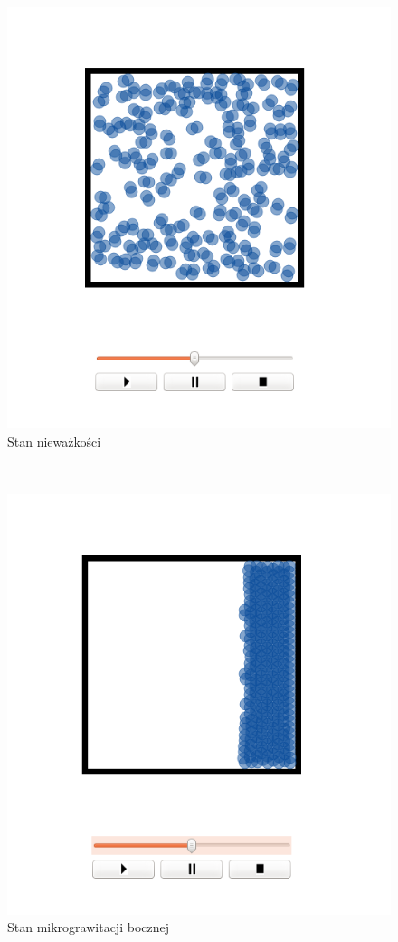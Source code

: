 \begin{minipage}{0.5\textwidth}
\begin{figure}[H]
 \begin{center}
  \includegraphics[width=\textwidth]{./rysunki/niewazkosc}
 \end{center}
 \caption{Stan nieważkości}
 \label{fig:niewazkosc}
\end{figure}
\end{minipage}
~
\begin{minipage}{0.5\textwidth}
\begin{figure}[H]
 \begin{center}
  \includegraphics[width=\textwidth]{./rysunki/niewazkosc1}
 \end{center}
 \caption{Stan mikrograwitacji bocznej}
 \label{fig:niewazkosc_stabilny}
\end{figure}
\end{minipage}\\[0.1cm]

